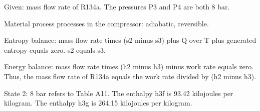 Given: mass flow rate of R134a.
The pressures P3 and P4 are both 8 bar.

Material process processes in the compressor: adiabatic, reversible.

Entropy balance: mass flow rate times (s2 minus s3) plus Q over T plus generated entropy equals zero.
s2 equals s3.

Energy balance: mass flow rate times (h2 minus h3) minus work rate equals zero.
Thus, the mass flow rate of R134a equals the work rate divided by (h2 minus h3).

State 2:
8 bar refers to Table A11.
The enthalpy h3f is 93.42 kilojoules per kilogram.
The enthalpy h3g is 264.15 kilojoules per kilogram.